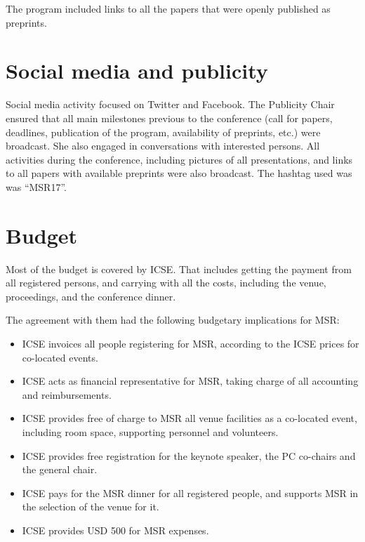 \documentclass[a4paper]{report}
\begin{document}
The program included links to all the papers that were openly published as preprints.


\section{Social media and publicity}

Social media activity focused on Twitter and Facebook. The Publicity Chair ensured that all main milestones previous to the conference (call for papers, deadlines, publication of the program, availability of preprints, etc.) were broadcast. She also engaged in conversations with interested persons. All activities during the conference, including pictures of all presentations, and links to all papers with available preprints were also broadcast. The hashtag used was was ``MSR17''.

\section{Budget}

Most of the budget is covered by ICSE. That includes getting the payment from all registered persons, and carrying with all the costs, including the venue, proceedings, and the conference dinner.

The agreement with them had the following budgetary implications for MSR:

\begin{itemize}
\item ICSE invoices all people registering for MSR, according to the ICSE prices for co-located events.
\item ICSE acts as financial representative for MSR, taking charge of all accounting and reimbursements.
\item ICSE provides free of charge to MSR all venue facilities as a co-located event, including room space, supporting personnel and volunteers.
\item ICSE provides free registration for the keynote speaker, the PC co-chairs and the general chair.
\item ICSE pays for the MSR dinner for all registered people, and supports MSR in the selection of the venue for it.
\item ICSE provides USD 500 for MSR expenses.
\end{itemize}
\end{document}
